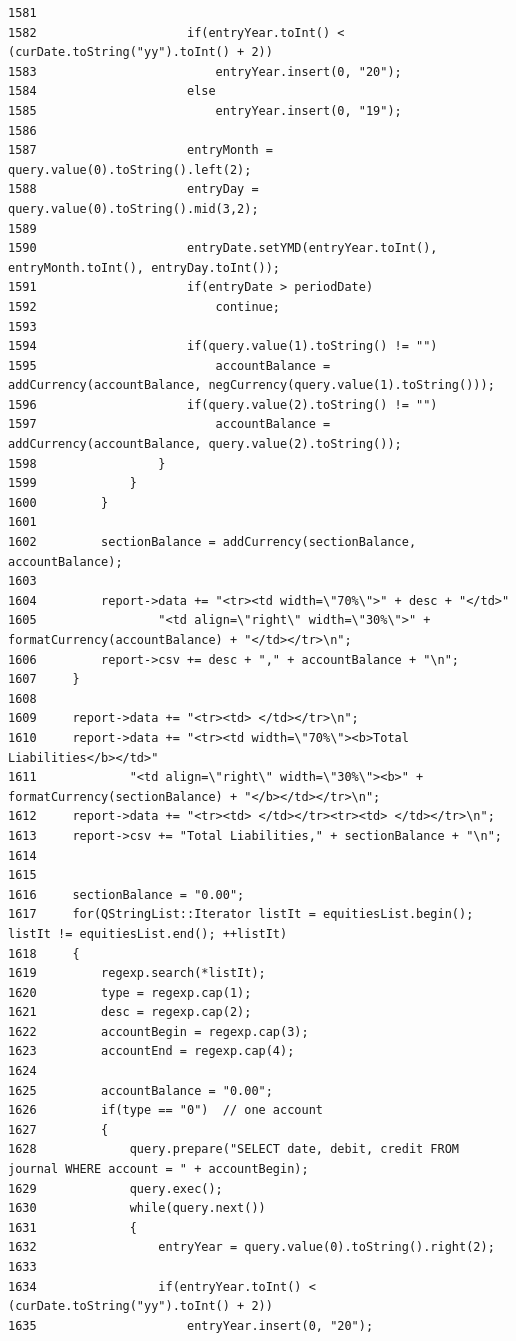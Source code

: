 \begin{verbatim}
1581                 
1582                     if(entryYear.toInt() < (curDate.toString("yy").toInt() + 2))
1583                         entryYear.insert(0, "20");
1584                     else
1585                         entryYear.insert(0, "19");
1586                 
1587                     entryMonth = query.value(0).toString().left(2);
1588                     entryDay = query.value(0).toString().mid(3,2);
1589 
1590                     entryDate.setYMD(entryYear.toInt(), entryMonth.toInt(), entryDay.toInt());
1591                     if(entryDate > periodDate)
1592                         continue;
1593 
1594                     if(query.value(1).toString() != "")
1595                         accountBalance = addCurrency(accountBalance, negCurrency(query.value(1).toString()));
1596                     if(query.value(2).toString() != "")
1597                         accountBalance = addCurrency(accountBalance, query.value(2).toString());
1598                 }
1599             }
1600         }
1601 
1602         sectionBalance = addCurrency(sectionBalance, accountBalance);
1603 
1604         report->data += "<tr><td width=\"70%\">" + desc + "</td>"
1605                 "<td align=\"right\" width=\"30%\">" + formatCurrency(accountBalance) + "</td></tr>\n";
1606         report->csv += desc + "," + accountBalance + "\n";
1607     }
1608 
1609     report->data += "<tr><td> </td></tr>\n";
1610     report->data += "<tr><td width=\"70%\"><b>Total Liabilities</b></td>"
1611             "<td align=\"right\" width=\"30%\"><b>" + formatCurrency(sectionBalance) + "</b></td></tr>\n";
1612     report->data += "<tr><td> </td></tr><tr><td> </td></tr>\n";
1613     report->csv += "Total Liabilities," + sectionBalance + "\n";
1614 
1615 
1616     sectionBalance = "0.00";
1617     for(QStringList::Iterator listIt = equitiesList.begin(); listIt != equitiesList.end(); ++listIt)
1618     {
1619         regexp.search(*listIt);
1620         type = regexp.cap(1);
1621         desc = regexp.cap(2);
1622         accountBegin = regexp.cap(3);
1623         accountEnd = regexp.cap(4);
1624 
1625         accountBalance = "0.00";
1626         if(type == "0")  // one account
1627         {
1628             query.prepare("SELECT date, debit, credit FROM journal WHERE account = " + accountBegin);
1629             query.exec();
1630             while(query.next())
1631             {
1632                 entryYear = query.value(0).toString().right(2);
1633                 
1634                 if(entryYear.toInt() < (curDate.toString("yy").toInt() + 2))
1635                     entryYear.insert(0, "20");

\end{verbatim}
